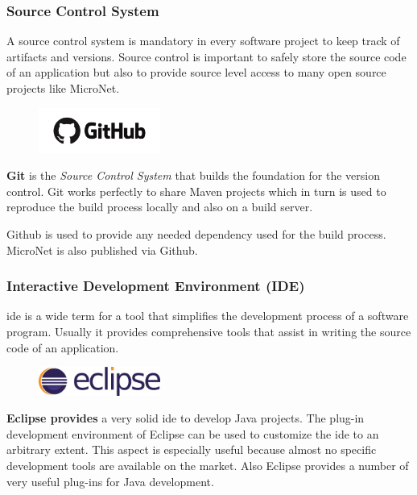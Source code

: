 \subsubsection{Source Control System}

A source control system is mandatory in every software project to keep track of
artifacts and versions. Source control is important to safely store the source
code of an application but also to provide source level access to many open
source projects like MicroNet.\\

\begin{figure}
    \includegraphics[width=4cm]{images/dependencies/github}
\end{figure}

\textbf{Git} is the \textit{Source Control System} that builds the foundation
for the version control. Git works perfectly to share Maven projects which in
turn is used to reproduce the build process locally and also on a build server.

Github is used to provide any needed dependency used for the build process.
MicroNet is also published via Github.

\subsubsection{Interactive Development Environment (IDE)}

\gls{ide} is a wide term for a tool that simplifies the development process of a
software program. Usually it provides comprehensive tools that assist in writing
the source code of an application.\\

\begin{figure}
    \includegraphics[width=4cm]{images/dependencies/eclipse}
\end{figure}

\noindent\textbf{Eclipse provides} a very solid \gls{ide} to develop Java
projects. The plug-in development environment of Eclipse can be used to
customize the \gls{ide} to an arbitrary extent. This aspect is especially useful
because almost no specific \ms{} development tools are available on the market.
Also Eclipse provides a number of very useful plug-ins for Java development.

